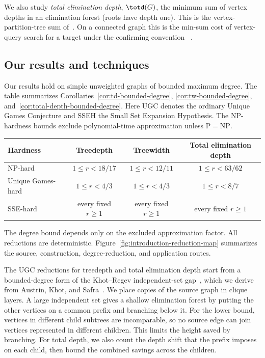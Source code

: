 We also study \emph{total elimination depth}, $\totd(G)$, the minimum
sum of vertex depths in an elimination forest (roots have depth one).
This is the vertex-partition-tree sum of~\cite{HogemoEtAl2021}. On a
connected graph this is the min-sum cost of vertex-query
search for a target under the confirming convention
~\cite{HogemoEtAl2021,Szyfelbein2025GraphSearch}.

\subsection{Our results and techniques}
\label{subsec:results-techniques}

Our results hold on simple unweighted graphs of bounded maximum degree.
The table summarizes Corollaries~\ref{cor:td-bounded-degree},
\ref{cor:tw-bounded-degree}, and~\ref{cor:total-depth-bounded-degree}.
Here UGC denotes the ordinary Unique Games Conjecture and SSEH the Small Set
Expansion Hypothesis. The NP-hardness bounds exclude polynomial-time
approximation unless $\mathrm{P}=\mathrm{NP}$.

\begin{center}
\begin{tabular}{lccc}
\toprule
\textup{Hardness} & \textup{Treedepth} & \textup{Treewidth}
                  & \textup{Total elimination depth}\\
\midrule
\textup{NP-hard} & $1\leq r<18/17$ & $1\leq r<12/11$
                 & $1\leq r<63/62$\\
\textup{Unique Games-hard} & $1\leq r<4/3$ & $1\leq r<4/3$
                           & $1\leq r<8/7$\\
\textup{SSE-hard} & \textup{every fixed }$r\geq1$
                & \textup{every fixed }$r\geq1$
                & \textup{every fixed }$r\geq1$\\
\bottomrule
\end{tabular}
\end{center}
The degree bound depends only on the excluded approximation factor.
All reductions are deterministic.
Figure~\ref{fig:introduction-reduction-map} summarizes the source,
construction, degree-reduction, and application routes.

The UGC reductions for treedepth and total elimination depth start from a
bounded-degree form of the Khot--Regev independent-set gap~\cite{KhotRegev},
which we derive from Austrin, Khot, and Safra~\cite{AKS2011}. We place copies of the
source graph in clique layers. A large independent set gives a shallow
elimination forest by putting the other vertices on a common prefix and
branching below it. For the lower bound, vertices in different child
subtrees are incomparable, so no source edge can join vertices represented
in different children. This limits the height saved by branching. For
total depth, we also count the depth shift that the prefix imposes on each
child, then bound the combined savings across the children.

